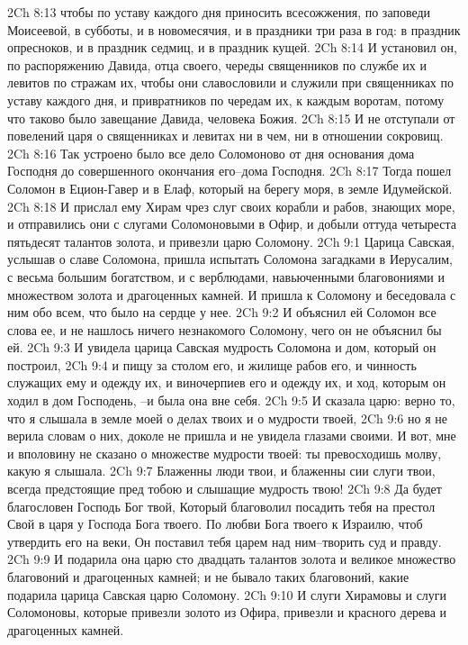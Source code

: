 2Ch 8:13  чтобы по уставу каждого дня приносить всесожжения, по заповеди Моисеевой, в субботы, и в новомесячия, и в праздники три раза в год: в праздник опресноков, и в праздник седмиц, и в праздник кущей.
2Ch 8:14  И установил он, по распоряжению Давида, отца своего, череды священников по службе их и левитов по стражам их, чтобы они славословили и служили при священниках по уставу каждого дня, и привратников по чередам их, к каждым воротам, потому что таково было завещание Давида, человека Божия.
2Ch 8:15  И не отступали от повелений царя о священниках и левитах ни в чем, ни в отношении сокровищ.
2Ch 8:16  Так устроено было все дело Соломоново от дня основания дома Господня до совершенного окончания его--дома Господня.
2Ch 8:17  Тогда пошел Соломон в Ецион-Гавер и в Елаф, который на берегу моря, в земле Идумейской.
2Ch 8:18  И прислал ему Хирам чрез слуг своих корабли и рабов, знающих море, и отправились они с слугами Соломоновыми в Офир, и добыли оттуда четыреста пятьдесят талантов золота, и привезли царю Соломону.
2Ch 9:1  Царица Савская, услышав о славе Соломона, пришла испытать Соломона загадками в Иерусалим, с весьма большим богатством, и с верблюдами, навьюченными благовониями и множеством золота и драгоценных камней. И пришла к Соломону и беседовала с ним обо всем, что было на сердце у нее.
2Ch 9:2  И объяснил ей Соломон все слова ее, и не нашлось ничего незнакомого Соломону, чего он не объяснил бы ей.
2Ch 9:3  И увидела царица Савская мудрость Соломона и дом, который он построил,
2Ch 9:4  и пищу за столом его, и жилище рабов его, и чинность служащих ему и одежду их, и виночерпиев его и одежду их, и ход, которым он ходил в дом Господень, --и была она вне себя.
2Ch 9:5  И сказала царю: верно то, что я слышала в земле моей о делах твоих и о мудрости твоей,
2Ch 9:6  но я не верила словам о них, доколе не пришла и не увидела глазами своими. И вот, мне и вполовину не сказано о множестве мудрости твоей: ты превосходишь молву, какую я слышала.
2Ch 9:7  Блаженны люди твои, и блаженны сии слуги твои, всегда предстоящие пред тобою и слышащие мудрость твою!
2Ch 9:8  Да будет благословен Господь Бог твой, Который благоволил посадить тебя на престол Свой в царя у Господа Бога твоего. По любви Бога твоего к Израилю, чтоб утвердить его на веки, Он поставил тебя царем над ним--творить суд и правду.
2Ch 9:9  И подарила она царю сто двадцать талантов золота и великое множество благовоний и драгоценных камней; и не бывало таких благовоний, какие подарила царица Савская царю Соломону.
2Ch 9:10  И слуги Хирамовы и слуги Соломоновы, которые привезли золото из Офира, привезли и красного дерева и драгоценных камней.

